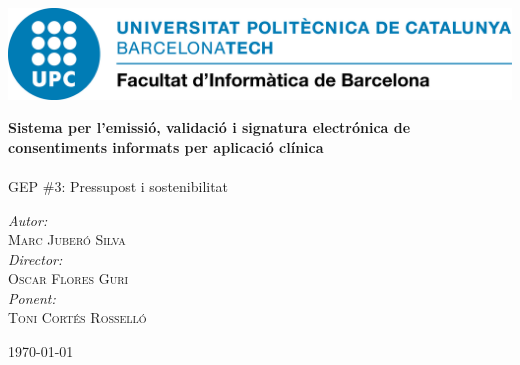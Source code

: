 \begin{titlepage}
\center

\includegraphics[scale=0.4]{img/UPC-FIB.png}
\vspace{2cm}


{\huge \bfseries Sistema per l'emissió, validació i signatura electrónica de consentiments informats per aplicació clínica}\\[0.4cm]
\HRule \\[0.2cm]


\Large GEP \#3: Pressupost i sostenibilitat

\vspace{8cm}

\emph{Autor:}\\ \large
 \textsc{Marc Juberó Silva}\\
\vspace{0.5cm}
\emph{Director:}\\ \large
 \textsc{Oscar Flores Guri}\\
\vspace{0.5cm}
\emph{Ponent:}\\ \large
 \textsc{Toni Cortés Rosselló}\\

\vspace{1cm}


{\large \today}\\[1cm] %

\vfill
\end{titlepage}